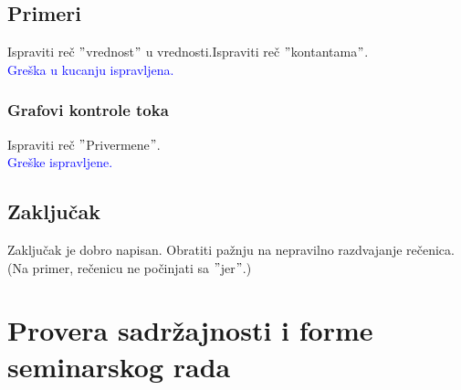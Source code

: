 \documentclass[a4paper]{report}
\newcommand{\odgovor}[1]{\textcolor{blue}{#1}}
\begin{document}
\subsection{Primeri}
Ispraviti reč $"$vrednost$"$ u vrednosti.Ispraviti reč $"$kontantama$"$. 
\\
\odgovor{Greška u kucanju ispravljena.}
\subsubsection{Grafovi kontrole toka}
Ispraviti reč $"$Privermene$"$.
\\
\odgovor{Greške ispravljene.}

\subsection{Zaključak}
Zaključak je dobro napisan. Obratiti pažnju na nepravilno razdvajanje rečenica. (Na primer, rečenicu ne počinjati sa $"$jer$"$.)
\section{Provera sadržajnosti i forme seminarskog rada}
\end{document}
